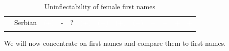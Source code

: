 \documentclass[output=paper,colorlinks,citecolor=brown]{langscibook}
\begin{document}
\begin{table}[ht]
\begin{tabularx}{0.92\textwidth}{cL{2cm}ccccccccccc}
		& Serbian & \textcolor{white}{(+)} & - & ? & \textcolor{white}{(+)} & \textcolor{white}{(+)} & \textcolor{white}{(+)} & \textcolor{white}{(+)} & \textcolor{white}{+} & \textcolor{white}{+} & \textcolor{white}{+} & \textcolor{white}{+} \\
		\lspbottomrule
	\end{tabularx}
	\caption{Uninflectability of female first names}
	\label{03tab8}
\end{table}

We will now concentrate on  first names and compare them to  first names.
\end{document}
